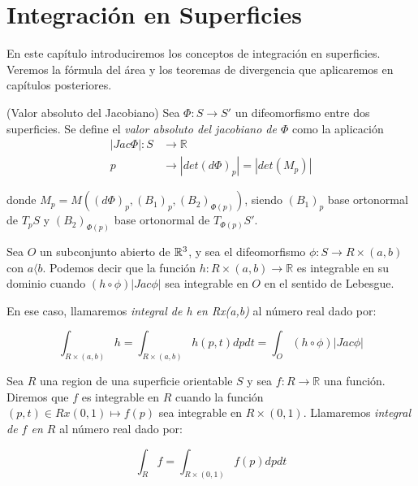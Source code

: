 \section{Integración en Superficies}

En este capítulo introduciremos los conceptos de integración en superficies. Veremos la fórmula del área y los teoremas de divergencia que aplicaremos en capítulos posteriores.

\begin{definition}(Valor absoluto del Jacobiano)
Sea $\Phi: S \longrightarrow S'$ un difeomorfismo entre dos superficies. Se define el \textit{valor absoluto del jacobiano de $\Phi$} como la aplicación
\begin{align*}
    |Jac \Phi|: S &\longrightarrow \mathbb{R} \\
    p &\longrightarrow |det(d\Phi)_p| = |det(M_p)|
\end{align*}

donde $M_p=M((d\Phi)_p, (B_1)_p, (B_2)_{\Phi(p)})$, siendo $(B_1)_p$ base ortonormal de $T_pS$ y $(B_2)_{\Phi(p)}$ base ortonormal de $T_{\Phi(p)}S'$.
\end{definition}

\begin{definition}
Sea $O$ un subconjunto abierto de $\mathbb{R}^3$, y sea el difeomorfismo $\phi: S \longrightarrow R \times (a,b)$ con $a  \langle  b$. Podemos decir que la función $h: R \times (a,b) \longrightarrow \mathbb{R}$ es integrable en su dominio cuando $(h \circ \phi)|Jac \phi|$ sea integrable en $O$ en el sentido de Lebesgue.

En ese caso, llamaremos \textit{integral de h en Rx(a,b)} al número real dado por:

\begin{equation*}
    \int_{R \times (a,b)} h = \int_{R \times (a,b)} h(p, t)dp dt = \int_{O} (h \circ \phi)|Jac \phi|
\end{equation*}
\end{definition}

\begin{definition}[Integral en $S$]
Sea $R$ una region de una superficie orientable $S$ y sea $f:R \longrightarrow \mathbb{R}$ una función. Diremos que $f$ es integrable en $R$ cuando la función $(p,t) \in Rx(0,1) \mapsto f(p)$ sea integrable en $R \times (0,1)$. Llamaremos \textit{integral de $f$ en $R$} al número real dado por:

\begin{equation*}
    \int_{R} f = \int_{R \times (0,1)} f(p)dp dt
\end{equation*}
\end{definition}

